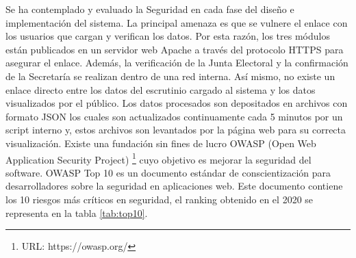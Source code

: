 Se ha contemplado y evaluado la Seguridad en cada fase  del diseño e implementación del sistema.  La principal amenaza es que se vulnere el enlace con los usuarios que cargan y verifican los datos.  Por esta razón, los tres módulos están publicados en un servidor web Apache a través del protocolo HTTPS para asegurar el enlace. Además, la verificación de la Junta Electoral y la confirmación de la Secretaría se realizan dentro de una red interna. \newline
Así mismo, no existe un enlace directo entre los datos del escrutinio cargado al sistema y los datos visualizados por el
público. Los datos procesados son depositados en archivos con formato JSON los cuales son actualizados continuamente cada 5 minutos por un script interno y, estos archivos son levantados por la página web para su correcta visualización. \newline
Existe una fundación sin fines de lucro OWASP (Open Web Application Security Project) \footnote{URL: https://owasp.org/} cuyo objetivo es mejorar la seguridad del software. OWASP Top 10 es un documento estándar de conscientización para desarrolladores sobre la seguridad en aplicaciones web. Este documento contiene los 10 riesgos más críticos en seguridad, el ranking obtenido en el 2020 se representa en la tabla \ref{tab:top10}.

